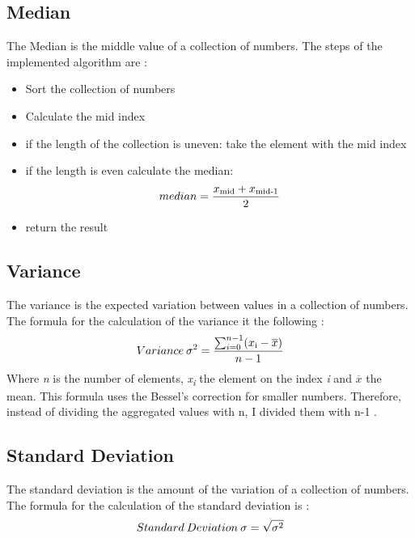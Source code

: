 \documentclass[10pt, a4paper, twocolumn]{article} %
\begin{document}
\subsection{Median}
The Median is the middle value of a collection of numbers. The steps of the implemented algorithm are
\citep{medianCFI}: 
\begin{itemize}
	\item Sort the collection of numbers 
	\item Calculate the mid index 
	\item if the length of the collection is uneven: take the element with the mid index
	\item if the length is even calculate the median: 
	\[
	median = \frac{x\textsubscript{mid} + x\textsubscript{mid-1}} {2}
	\]
	\item return the result
\end{itemize}




\subsection{Variance}
The variance is the expected variation between values in a collection of numbers. 
The formula for the calculation of the variance it the following
\citep{varianceAndStandardDeviationStack}: 
\[
Variance\:\sigma\textsuperscript{2} = \frac{\sum_{i=0}^{n-1}(x\textsubscript{i} - \overline{x})}{n-1}
\]
Where \textit{n} is the number of elements, \textit{x\textsubscript{i}} the element on the index \textit{i} and \textit{$\overline{x}$} the mean. This formula uses the Bessel's correction for smaller numbers. Therefore, instead of dividing the aggregated values with n, I divided them with n-1 \citep{varianceAndStandardDeviationStack}. 



\subsection{Standard Deviation}
The standard deviation is the amount of the variation of a collection of numbers. 
The formula for the calculation of the standard deviation is
\citep{varianceAndStandardDeviationStack}: 
\[
Standard\:Deviation\:\sigma = \sqrt{\sigma\textsuperscript{2}}
\]


\end{document}

